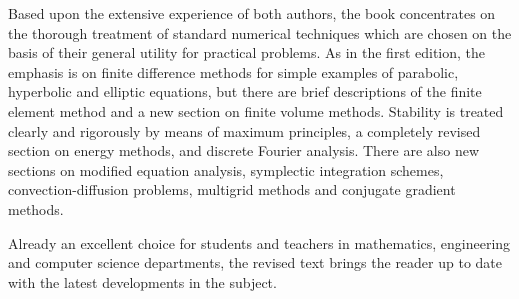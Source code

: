 \documentclass[10pt]{article}
\begin{document}
Based upon the extensive experience of both authors, the book concentrates on the thorough treatment of standard numerical techniques which are chosen on the basis of their general utility for practical problems. As in the first edition, the emphasis is on finite difference methods for simple examples of parabolic, hyperbolic and elliptic equations, but there are brief descriptions of the finite element method and a new section on finite volume methods. Stability is treated clearly and rigorously by means of maximum principles, a completely revised section on energy methods, and discrete Fourier analysis. There are also new sections on modified equation analysis, symplectic integration schemes, convection-diffusion problems, multigrid methods and conjugate gradient methods.

Already an excellent choice for students and teachers in mathematics, engineering and computer science departments, the revised text brings the reader up to date with the latest developments in the subject.
\end{document}
